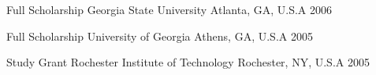 

\begin{cvhonors}

  \cvhonor
    {Full Scholarship} %
    {Georgia State University} %
    {Atlanta, GA, U.S.A} %
    {2006} %

  \cvhonor
    {Full Scholarship} %
    {University of Georgia} %
    {Athens, GA, U.S.A} %
    {2005} %

  \cvhonor
    {Study Grant} %
    {Rochester Institute of Technology} %
    {Rochester, NY, U.S.A} %
    {2005} %
		
\end{cvhonors}
